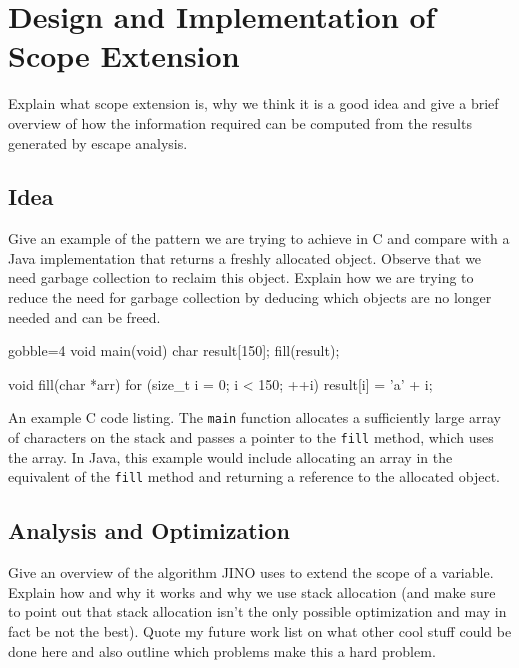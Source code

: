 
\chapter{Design and Implementation of Scope Extension}
	\label{chapter:scopeext}
	Explain what scope extension is, why we think it is a good idea and give a brief overview of how the information
	required can be computed from the results generated by escape analysis.

	\section{Idea}
		\label{sec:scopeext:idea}
		Give an example of the pattern we are trying to achieve in C and compare with a Java implementation that returns
		a freshly allocated object. Observe that we need garbage collection to reclaim this object. Explain how we are
		trying to reduce the need for garbage collection by deducing which objects are no longer needed and can be freed.

		\begin{listing}
			\begin{ccode*}{gobble=4}
				void main(void) {
					char result[150];
					fill(result);
				}

				void fill(char *arr) {
					for (size_t i = 0; i < 150; ++i) {
						result[i] = 'a' + i;
					}
				}
			\end{ccode*}
			\caption[An example C code listing.]{An example C code listing. The \texttt{main} function allocates
			a sufficiently large array of characters on the stack and passes a pointer to the \texttt{fill} method, which uses
			the array. In Java, this example would include allocating an array in the equivalent of the \texttt{fill} method
			and returning a reference to the allocated object.}
			\label{lst:scopeext:idea:c-example}
		\end{listing}

	\section{Analysis and Optimization}
		\label{sec:scopeext:analysis}
		Give an overview of the algorithm JINO uses to extend the scope of a variable. Explain how and why it works and why
		we use stack allocation (and make sure to point out that stack allocation isn't the only possible optimization and
		may in fact be not the best). Quote my future work list on what other cool stuff could be done here and also outline
		which problems make this a hard problem.

